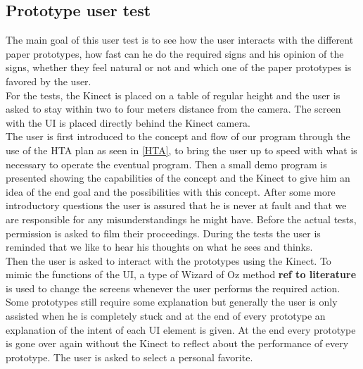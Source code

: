 \subsection{Prototype user test}

The main goal of this user test is to see how the user interacts with the different paper prototypes, how fast can he do the required signs and his opinion of the signs, whether they feel natural or not and which one of the paper prototypes is favored by the user. \\

For the tests, the Kinect is placed on a table of regular height and the user is asked to stay within two to four meters distance from the camera. The screen with the UI is placed directly behind the Kinect camera.\\

The user is first introduced to the concept and flow of our program through the use of the HTA plan as seen in \ref{HTA}, to bring the user up to speed with what is necessary to operate the eventual program. Then a small demo program is presented showing the capabilities of the concept and the Kinect to give him an idea of the end goal and the possibilities with this concept. After some more introductory questions the user is assured that he is never at fault and that we are responsible for any misunderstandings he might have. Before the actual tests, permission is asked to film their proceedings. During the tests the user is reminded that we like to hear his thoughts on what he sees and thinks.\\

Then the user is asked to interact with the prototypes using the Kinect. To mimic the functions of the UI, a type of Wizard of Oz method \textbf{ref to literature} is used to change the screens whenever the user performs the required action. Some prototypes still require some explanation but generally the user is only assisted when he is completely stuck and at the end of every prototype an explanation of the intent of each UI element is given. At the end every prototype is gone over again without the Kinect to reflect about the performance of every prototype. The user is asked to select a personal favorite.\\

